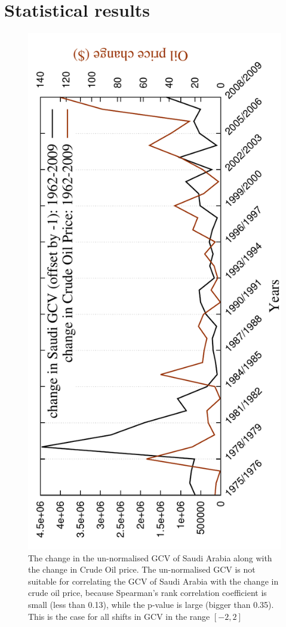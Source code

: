 
\chapter{Statistical results}


\begin{figure}[H]
  \centering
\includegraphics[angle=-90,scale=0.6]
{../code/extra_results/saudi_oil/saudi_orig_gcv_oil2}
\caption[The change in the un-normalised GCV of Saudi Arabia along with the change in Crude Oil price.]{The change in the un-normalised GCV of Saudi Arabia along with the change in Crude Oil price. The un-normalised GCV is not suitable for correlating the GCV of Saudi Arabia with the change in crude oil price, because Spearman's rank correlation coefficient is small (less than 0.13), while the p-value is large (bigger than 0.35). This is the case for all shifts in GCV in the range $[-2,2]$}
\label{saudi_oil_orig}
\end{figure}

